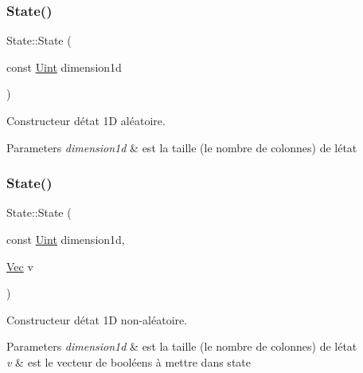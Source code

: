 \subsubsection{\texorpdfstring{State()}{State()}\hspace{0.1cm}{\footnotesize\ttfamily [4/7]}}
{\footnotesize\ttfamily State\+::\+State (\begin{DoxyParamCaption}\item[{const \mbox{\hyperlink{state_8h_a4840c4503b7d10cea5e08416eb3716f1}{Uint}}}]{dimension1d }\end{DoxyParamCaption})}



Constructeur d\textquotesingle{}état 1D aléatoire. 


\begin{DoxyParams}{Parameters}
{\em dimension1d} & est la taille (le nombre de colonnes) de l\textquotesingle{}état \\
\hline
\end{DoxyParams}
\mbox{\label{class_state_af599b90d950b89a489ac23a584b1c0e3}} 
\subsubsection{\texorpdfstring{State()}{State()}\hspace{0.1cm}{\footnotesize\ttfamily [5/7]}}
{\footnotesize\ttfamily State\+::\+State (\begin{DoxyParamCaption}\item[{const \mbox{\hyperlink{state_8h_a4840c4503b7d10cea5e08416eb3716f1}{Uint}}}]{dimension1d,  }\item[{\mbox{\hyperlink{state_8h_aa074fbe250e9d18fbe221bb7473158ad}{Vec}}}]{v }\end{DoxyParamCaption})}



Constructeur d\textquotesingle{}état 1D non-\/aléatoire. 


\begin{DoxyParams}{Parameters}
{\em dimension1d} & est la taille (le nombre de colonnes) de l\textquotesingle{}état \\
\hline
{\em v} & est le vecteur de booléens à mettre dans state \\
\hline
\end{DoxyParams}
\mbox{\label{class_state_a72792193d86ae159600a31bf40dd3912}} 
